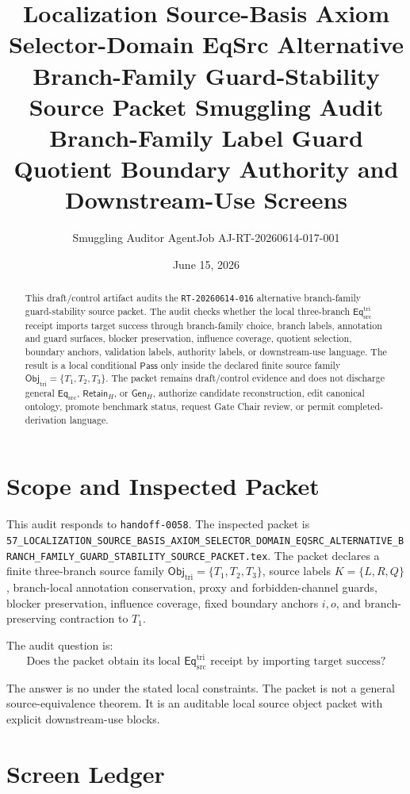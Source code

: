 \documentclass[11pt]{article}
\title{\textbf{Localization Source-Basis Axiom Selector-Domain EqSrc Alternative Branch-Family Guard-Stability Source Packet Smuggling Audit}\\[0.35em]
\large Branch-Family Label Guard Quotient Boundary Authority and Downstream-Use Screens}
\author{Smuggling Auditor AgentJob AJ-RT-20260614-017-001}
\date{June 15, 2026}
\newcommand{\EqSrc}{\mathsf{Eq}_{\mathrm{src}}}
\newcommand{\EqTri}{\mathsf{Eq}_{\mathrm{src}}^{\mathrm{tri}}}
\newcommand{\ObjTri}{\mathsf{Obj}_{\mathrm{tri}}}
\newcommand{\RetainH}{\mathsf{Retain}_{H}}
\newcommand{\GenH}{\mathsf{Gen}_{H}}
\newcommand{\Pass}{\mathsf{Pass}}
\begin{document}
\maketitle

\begin{abstract}
This draft/control artifact audits the \texttt{RT-20260614-016}
alternative branch-family guard-stability source packet. The audit checks
whether the local three-branch \(\EqTri\) receipt imports target success
through branch-family choice, branch labels, annotation and guard
surfaces, blocker preservation, influence coverage, quotient selection,
boundary anchors, validation labels, authority labels, or downstream-use
language. The result is a local conditional \(\Pass\) only inside the
declared finite source family \(\ObjTri=\{T_{1},T_{2},T_{3}\}\). The
packet remains draft/control evidence and does not discharge general
\(\EqSrc\), \(\RetainH\), or \(\GenH\), authorize candidate
reconstruction, edit canonical ontology, promote benchmark status,
request Gate Chair review, or permit completed-derivation language.
\end{abstract}

\section{Scope and Inspected Packet}

This audit responds to \texttt{handoff-0058}. The inspected packet is
\texttt{57\_LOCALIZATION\_SOURCE\_BASIS\_AXIOM\_SELECTOR\_DOMAIN\_EQSRC\_ALTERNATIVE\_BRANCH\_FAMILY\_GUARD\_STABILITY\_SOURCE\_PACKET.tex}.
The packet declares a finite three-branch source family
\(\ObjTri=\{T_{1},T_{2},T_{3}\}\), source labels \(K=\{L,R,Q\}\),
branch-local annotation conservation, proxy and forbidden-channel
guards, blocker preservation, influence coverage, fixed boundary anchors
\(i,o\), and branch-preserving contraction to \(T_{1}\).

The audit question is:
\[
    \text{Does the packet obtain its local }\EqTri\text{ receipt by
    importing target success?}
\]

The answer is no under the stated local constraints. The packet is not a
general source-equivalence theorem. It is an auditable local source
object packet with explicit downstream-use blocks.

\section{Screen Ledger}
\end{document}
